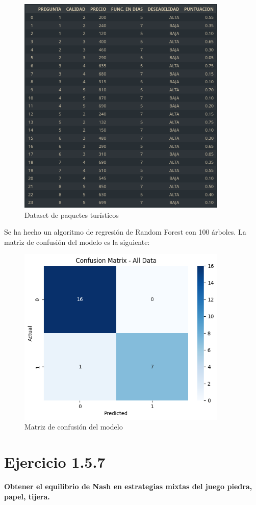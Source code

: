 \documentclass[12pt, letterpaper]{article}
\begin{document}
\newpage
\begin{figure}[h]
    \centering
    \includegraphics[width=10cm]{images/dataset.png}
    \caption{Dataset de paquetes turísticos\label{fig:paquetes}}
\end{figure}

\newpage
Se ha hecho un algoritmo de regresión de Random Forest con 100 árboles. La matriz de confusión del modelo es la siguiente:
\begin{figure}[h]
    \centering
    \includegraphics[width=10cm]{images/confusion_matrix.png}
    \caption{Matriz de confusión del modelo\label{fig:confusion_matrix}}
\end{figure}

\newpage
\section{Ejercicio 1.5.7}
\textbf{Obtener el equilibrio de Nash en estrategias mixtas del juego piedra, papel, tijera.}
\end{document}
